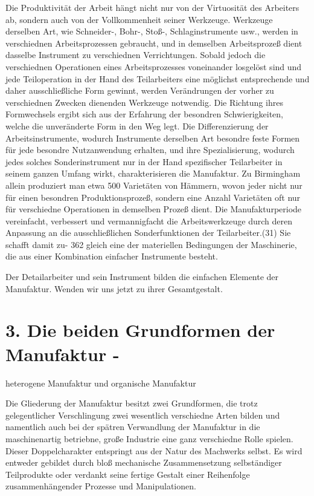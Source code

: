 {Die Produktivität der Arbeit hängt nicht nur von der Virtuosität des
Arbeiters ab, sondern auch von der Vollkommenheit seiner Werkzeuge.
Werkzeuge derselben Art, wie Schneider-, Bohr-, Stoß-, Schlaginstrumente
usw., werden in verschiednen Arbeitsprozessen gebraucht, und in
demselben Arbeitsprozeß dient dasselbe Instrument zu verschiednen
Verrichtungen. Sobald jedoch die verschiednen Operationen eines
Arbeitsprozesses voneinander losgelöst sind und jede Teiloperation in
der Hand des Teilarbeiters eine möglichst entsprechende und daher
ausschließliche Form gewinnt, werden Verändrungen der vorher zu
verschiednen Zwecken dienenden Werkzeuge notwendig. Die Richtung ihres
Formwechsels ergibt sich aus der Erfahrung der besondren
Schwierigkeiten, welche die unveränderte Form in den Weg legt. Die
Differenzierung der Arbeitsinstrumente, wodurch Instrumente derselben
Art besondre feste Formen für jede besondre Nutzanwendung erhalten, und
ihre Spezialisierung, wodurch jedes solches Sonderinstrument nur in der
Hand spezifischer Teilarbeiter in seinem ganzen Umfang wirkt,
charakterisieren die Manufaktur. Zu Birmingham allein produziert man
etwa 500 Varietäten von Hämmern, wovon jeder nicht nur für einen
besondren Produktionsprozeß, sondern eine Anzahl Varietäten oft nur für
verschiedne Operationen in demselben Prozeß dient. Die Manufakturperiode
vereinfacht, verbessert und vermannigfacht die Arbeitswerkzeuge durch
deren Anpassung an die ausschließlichen Sonderfunktionen der
Teilarbeiter.(31) Sie schafft damit zu- \num{362}
gleich eine der materiellen Bedingungen der Maschinerie, die aus einer
Kombination einfacher Instrumente besteht.

Der Detailarbeiter und sein Instrument bilden die einfachen Elemente der
Manufaktur. Wenden wir uns jetzt zu ihrer Gesamtgestalt.

{%
\section{3. Die beiden Grundformen der Manufaktur
-}\label{die-beiden-grundformen-der-manufaktur--}}

heterogene Manufaktur und organische Manufaktur

Die Gliederung der Manufaktur besitzt zwei Grundformen, die trotz
gelegentlicher Verschlingung zwei wesentlich verschiedne Arten bilden
und namentlich auch bei der spätren Verwandlung der Manufaktur in die
maschinenartig betriebne, große Industrie eine ganz verschiedne Rolle
spielen. Dieser Doppelcharakter entspringt aus der Natur des Machwerks
selbst. Es wird entweder gebildet durch bloß mechanische Zusammensetzung
selbständiger Teilprodukte oder verdankt seine fertige Gestalt einer
Reihenfolge zusammenhängender Prozesse und Manipulationen.

}
